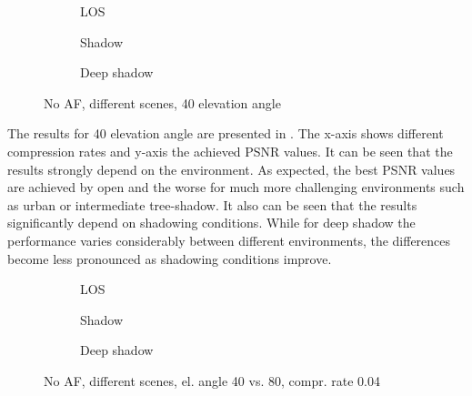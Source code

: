 \documentclass[conference]{IEEEtran}
\begin{document}
\begin{figure}[t!]
  \begin{subfigure}{.3\linewidth}
  \centering
  
  \vspace{-2.5em}
  \caption{LOS}
\end{subfigure}
\vspace{1ex}
\begin{subfigure}{.3\linewidth}
  \centering
  
  \vspace{-2.5em}
  \caption{Shadow}
\end{subfigure}
\vspace{1ex}
\begin{subfigure}{.3\linewidth}
  \centering
  
  \vspace{-2.5em}
  \caption{Deep shadow}
\end{subfigure}
\caption{No AF, different scenes, 40 elevation angle}
\label{fig:different_scenes_40}
\end{figure}

The results for 40 elevation angle are presented in . 
The x-axis shows different compression rates and y-axis the achieved PSNR values.
It can be seen that the results strongly depend on the environment.
As expected, the best PSNR values are achieved by open and the worse for much more challenging environments such as urban or intermediate tree-shadow.
It also can be seen that the results significantly depend on shadowing conditions. 
While for deep shadow the performance varies considerably between different environments, 
the differences become less pronounced as shadowing conditions improve.



\begin{figure}[t!]
  \begin{subfigure}{.3\linewidth}
  \centering
  
  \vspace{-2.5em}
  \caption{LOS}
\end{subfigure}
\vspace{1ex}
\begin{subfigure}{.3\linewidth}
  \centering
  
  \vspace{-2.5em}
  \caption{Shadow}
\end{subfigure}
\vspace{1ex}
\begin{subfigure}{.3\linewidth}
  \centering
  
  \vspace{-2.5em}
  \caption{Deep shadow}
\end{subfigure}
\caption{No AF, different scenes, el. angle 40 vs. 80, compr. rate 0.04}
\label{fig:elevation_angles_0.04}
\end{figure}
\end{document}
